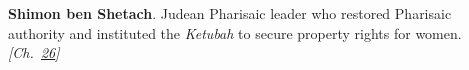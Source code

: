 \textbf{Shimon ben Shetach}. Judean Pharisaic leader who restored Pharisaic authority and instituted the \emph{Ketubah} to secure property rights for women. \emph{[Ch.~\hyperref[ch:jewishcalendar]{26}]}

